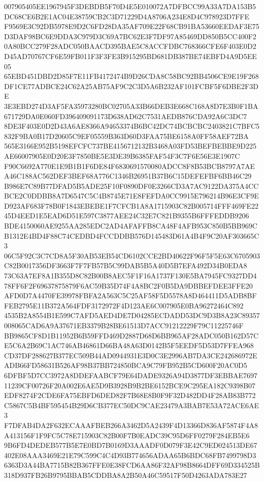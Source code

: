\documentclass[UTF8,fontset=fandol,zihao=-4,a4paper]{ctexart}
\begin{document}
{{007905405EE1967945F3DEBDB5F70D4E5E010072A7DFBCC99A33A7DA153B5DC68CE6B2E1AC04E38759CB2C3D71229D4A8706A234E8D4C978923D7FFE
F9569E3C92DB5978E9D2C6FD28DA35AF709E22F68CB91BA53660EEDAF3E75D3DAF98BC6E9DDA3C979D3C69A7BC62E3F7DF97A85469DD850B5CC400F2
0A80BCC279F28ADC050BAACD395BAE5C8ACCFDBC768366CFE6F403E0D2D45AD70767CF6E59FB011F3F3FE3B915295BD681DB387BE74EBFD4A9D5EE05
65EBD451DBD2D85F7E11FB4172474B9D26CDA8C58BC92BB4506CE9E19F268DF1CE77ADBCE24C62A25AB75AF9C2C3D5A6B232AF101FCBF5F6DBE2F3DE
3E3EBD274D3AF5FA35973280BC02705A33B66DEB3E668C168A8D7E3B0F1BA671729DA0E060FD396409091173D638AD62C7531AEDB876CDA92A6C3DC7
8DE3F403E0D2D43A6AE8366A94653374B6BC42DC74BCBCBC2403821C7BFC5832F9BA0B17D20605C9EF05559B363D60D3FAA75BE6158A0FF58AEF72BA
565E3166E952B5198EFCFC737BE4156712132B3468A03FD53BEFBEBBE9D225AE66007905E0D20E3F7850BE5E3DE39B6385FAF54F3C7F6E56E3E1907C
F90C6692A770E1E9B1B1F6DE84F6830691570080ADCC8F8B53BCB8797A7AEA46C188AC562DEF3BEF68A776C1346B26951B37B6C15DEFEFBF6BB46C29
B986E7C89B77DFAD5B5ADE25F10F0890DF0E3266CD3A7AC9122DA375A4CCBCE2C0DDBB8A7D6547C5C4B8745E71E8FEFDA0CC9915E796214B96E3CF9E
D923AF683F78B0F1843EBEBE1F7CFCB1A8A1715903C82B005714FFF469FE2245D4EED1E5EAD6D51E597C3877AEE24C32E7C821B9355B6FFFEDDB9206
BDE4150060AE9255AA285EDC2AD4AFAFFB8CA48F4AFB953C850B5BB969CB1312E4BD4F88C74CEDBD4FCCDDBB576D145483D61A4B4F9C20AF303665C3
06C5F92C3C7CD8A5F30AB53EB54CD6102CCE2BD40622F96F5F5E63C6705903C82B0017356DF3663F7F7FB57B5C99DAB5B5A40D5B7EFA492D34B0EDA8
73C63A7EF8A1B355D8C82B00B8AEC5F1F16A1737F130E5BA7945FC9327DD478FF6F2F69637875879F6AC59B35D74F4A8BC2F0B5DA9DBBEFDEE3FFE20
AFD0D7A4470FE39978FBFA2A563C5C25AF58F5D5578A8D464411D5ADB8BFFEB2795E11B372A564FDF3172972F4D123AE6C007905E0BA96272464C892
4535B2A8554B1E599C7AFD5AED4DE7D04285ECDADD53DC9D3B8A23C89357008065CAD6A9A37671EB3379B28BE61513D7ACC91212229F79C11225746F
BB9865CF8D1B11952B6B59FFD469D2887D68D6BB965AF28ADC050B162D57CE5C6A2B69C1AC746AB46861D66BA48A63D0142B5F5EEDF5D53D7FFEA968
CD37DF288627B377EC509B44AD0944931E3D0C3E2996AB7DA3CE242686972EADB66FD58631B526AF98B37BB724850BCA9C79FB952B5CD600F20AC0D5
6DFBF5D7CC3972A8DDEFAABCF79E64DADE9326A94D3877DF3EBBAE769711239CF00726F20A002E6AE5D9B3928B9B2BE6152BCE9C295EA182C9398B07
EDF8274F2CDE6FA75EBFD6DED82F7B68E8B0F9F32D482DD4F28AB83B772C5867C5B4BF595454B29D6CB377EC50DC9CAE23479A3BAB7E53A72ACE6AE3
F7DFAB4DA2F632ECAAAFBEB266A3462D5A2439F4D13366D836AF5874F4A8A413156F1F9FC5C78E715903C82B00F7B0EADC39C95D6FF0279F284EB5E6
9B6FD4DEDEB577B5E7E0BD7B0169D3AAADF0D079F3E42C9ED024513DE67402E08AAA3469E21E79C599C4C4D93B774656ADAA65B6BDC68FB7499798D3
6363D3A44BA7715B82B367FFE0E38FCD6AA86F32AF98B8664DFF69D334525B318D937FB26B9795BBAB5CDDBA8A2B50A46C59517F50D4263ADA783E27
}}
\end{document}
